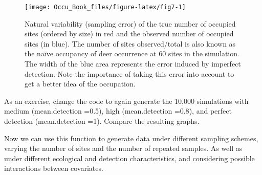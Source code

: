 \documentclass[
]{book}
\begin{document}
\begin{figure}
\texttt{[image: Occu\_Book\_files/figure-latex/fig7-1]} \caption[fig7]{Natural variability (sampling error) of the true number of occupied sites (ordered by size) in red and the observed number of occupied sites (in blue). The number of sites observed/total is also known as the naïve occupancy of deer occurrence at 60 sites in the simulation. The width of the blue area represents the error induced by imperfect detection. Note the importance of taking this error into account to get a better idea of the occupation.}\label{fig:fig7}
\end{figure}

As an exercise, change the code to again generate the 10,000 simulations with medium (mean.detection =0.5), high (mean.detection =0.8), and perfect detection (mean.detection =1). Compare the resulting graphs.

Now we can use this function to generate data under different sampling schemes, varying the number of sites and the number of repeated samples. As well as under different ecological and detection characteristics, and considering possible interactions between covariates.
\end{document}
